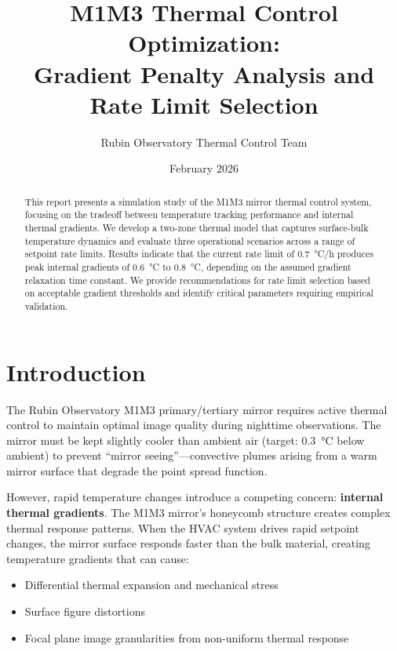\documentclass[11pt,a4paper]{article}
\title{M1M3 Thermal Control Optimization:\\
Gradient Penalty Analysis and Rate Limit Selection}
\author{Rubin Observatory Thermal Control Team}
\date{February 2026}
\begin{document}
\maketitle

\begin{abstract}
This report presents a simulation study of the M1M3 mirror thermal control system, focusing on the tradeoff between temperature tracking performance and internal thermal gradients. We develop a two-zone thermal model that captures surface-bulk temperature dynamics and evaluate three operational scenarios across a range of setpoint rate limits. Results indicate that the current rate limit of \SI{0.7}{\celsius/h} produces peak internal gradients of \SI{0.6}{\celsius} to \SI{0.8}{\celsius}, depending on the assumed gradient relaxation time constant. We provide recommendations for rate limit selection based on acceptable gradient thresholds and identify critical parameters requiring empirical validation.
\end{abstract}

\tableofcontents
\newpage

\section{Introduction}

The Rubin Observatory M1M3 primary/tertiary mirror requires active thermal control to maintain optimal image quality during nighttime observations. The mirror must be kept slightly cooler than ambient air (target: \SI{0.3}{\celsius} below ambient) to prevent ``mirror seeing''---convective plumes arising from a warm mirror surface that degrade the point spread function.

However, rapid temperature changes introduce a competing concern: \textbf{internal thermal gradients}. The M1M3 mirror's honeycomb structure creates complex thermal response patterns. When the HVAC system drives rapid setpoint changes, the mirror surface responds faster than the bulk material, creating temperature gradients that can cause:

\begin{itemize}
    \item Differential thermal expansion and mechanical stress
    \item Surface figure distortions
    \item Focal plane image granularities from non-uniform thermal response
\end{itemize}
\end{document}
